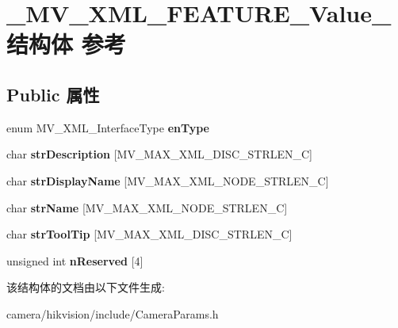 \hypertarget{struct___m_v___x_m_l___f_e_a_t_u_r_e___value__}{}\section{\+\_\+\+M\+V\+\_\+\+X\+M\+L\+\_\+\+F\+E\+A\+T\+U\+R\+E\+\_\+\+Value\+\_\+结构体 参考}
\label{struct___m_v___x_m_l___f_e_a_t_u_r_e___value__}
\subsection*{Public 属性}
\begin{DoxyCompactItemize}
\item 
\mbox{\label{struct___m_v___x_m_l___f_e_a_t_u_r_e___value___a89ddd3a25d1a77e3e1942adc93676d45}} 
enum M\+V\+\_\+\+X\+M\+L\+\_\+\+Interface\+Type {\bfseries en\+Type}
\item 
\mbox{\label{struct___m_v___x_m_l___f_e_a_t_u_r_e___value___a9bfbf4d9e5990f429bfa6f8811239c33}} 
char {\bfseries str\+Description} \mbox{[}M\+V\+\_\+\+M\+A\+X\+\_\+\+X\+M\+L\+\_\+\+D\+I\+S\+C\+\_\+\+S\+T\+R\+L\+E\+N\+\_\+C\mbox{]}
\item 
\mbox{\label{struct___m_v___x_m_l___f_e_a_t_u_r_e___value___a1f3e28a3a15cabe8998c31e08c364870}} 
char {\bfseries str\+Display\+Name} \mbox{[}M\+V\+\_\+\+M\+A\+X\+\_\+\+X\+M\+L\+\_\+\+N\+O\+D\+E\+\_\+\+S\+T\+R\+L\+E\+N\+\_\+C\mbox{]}
\item 
\mbox{\label{struct___m_v___x_m_l___f_e_a_t_u_r_e___value___abe34abdfa7e71a39e10ef3f46a5c010d}} 
char {\bfseries str\+Name} \mbox{[}M\+V\+\_\+\+M\+A\+X\+\_\+\+X\+M\+L\+\_\+\+N\+O\+D\+E\+\_\+\+S\+T\+R\+L\+E\+N\+\_\+C\mbox{]}
\item 
\mbox{\label{struct___m_v___x_m_l___f_e_a_t_u_r_e___value___af5c35f8836674787790324c2d77153b0}} 
char {\bfseries str\+Tool\+Tip} \mbox{[}M\+V\+\_\+\+M\+A\+X\+\_\+\+X\+M\+L\+\_\+\+D\+I\+S\+C\+\_\+\+S\+T\+R\+L\+E\+N\+\_\+C\mbox{]}
\item 
\mbox{\label{struct___m_v___x_m_l___f_e_a_t_u_r_e___value___a2c6c324138292b355e947b496a37307d}} 
unsigned int {\bfseries n\+Reserved} \mbox{[}4\mbox{]}
\end{DoxyCompactItemize}


该结构体的文档由以下文件生成\+:\begin{DoxyCompactItemize}
\item 
camera/hikvision/include/Camera\+Params.\+h\end{DoxyCompactItemize}
